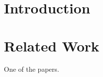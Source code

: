 \documentclass{article}
\begin{document}
\section{Introduction}
\section{Related Work}
One of the papers.\cite{strobelt2018s}



\end{document}
